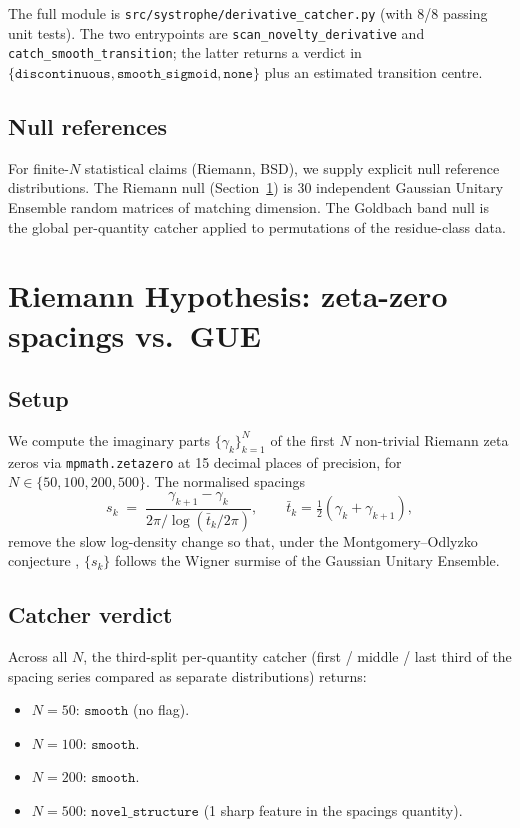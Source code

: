 \documentclass[11pt,letterpaper]{article}
\begin{document}
The full module is \texttt{src/systrophe/derivative\_catcher.py} (with 8/8 passing unit tests). The two entrypoints are \texttt{scan\_novelty\_derivative} and \texttt{catch\_smooth\_transition}; the latter returns a verdict in $\{\mathtt{discontinuous}, \mathtt{smooth\_sigmoid}, \mathtt{none}\}$ plus an estimated transition centre.

\subsection{Null references}

For finite-$N$ statistical claims (Riemann, BSD), we supply explicit null reference distributions. The Riemann null (Section~\ref{sec:riemann}) is 30 independent Gaussian Unitary Ensemble random matrices of matching dimension. The Goldbach band null is the global per-quantity catcher applied to permutations of the residue-class data.

\section{Riemann Hypothesis: zeta-zero spacings vs.\ GUE}\label{sec:riemann}

\subsection{Setup}

We compute the imaginary parts $\{\gamma_k\}_{k=1}^N$ of the first $N$ non-trivial Riemann zeta zeros via \texttt{mpmath.zetazero} at 15 decimal places of precision, for $N \in \{50, 100, 200, 500\}$. The normalised spacings
\[
s_k \;=\; \frac{\gamma_{k+1} - \gamma_k}{2\pi / \log(\bar{t}_k / 2\pi)}, \qquad \bar{t}_k = \tfrac{1}{2}(\gamma_k + \gamma_{k+1}),
\]
remove the slow log-density change so that, under the Montgomery--Odlyzko conjecture \cite{montgomery1973}, $\{s_k\}$ follows the Wigner surmise of the Gaussian Unitary Ensemble.

\subsection{Catcher verdict}

Across all $N$, the third-split per-quantity catcher (first / middle / last third of the spacing series compared as separate distributions) returns:
\begin{itemize}[leftmargin=*,itemsep=0pt]
\item $N=50$: $\mathtt{smooth}$ (no flag).
\item $N=100$: $\mathtt{smooth}$.
\item $N=200$: $\mathtt{smooth}$.
\item $N=500$: $\mathtt{novel\_structure}$ (1 sharp feature in the spacings quantity).
\end{itemize}
\end{document}
